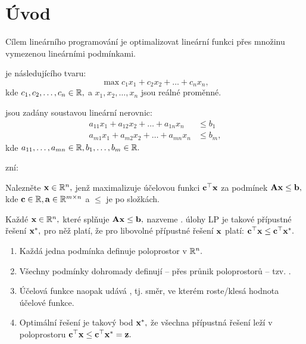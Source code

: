 \section{Úvod}

\begin{remark}
    Cílem lineárního programování je optimalizovat lineární funkci přes
    množinu vymezenou lineárními podmínkami.

     je následujícího tvaru:
    \begin{equation*}
        \max c_1x_1 + c_2x_2 + \dots + c_nx_n,
    \end{equation*}
    kde $c_1,c_2,\dots,c_n \in \mathbb{R},$ a $x_1,x_2,\dots,x_n$ jsou reálné
    proměnné.

     jsou zadány soustavou lineární nerovnic:
    \begin{align*}
        a_{11}x_1 + a_{12}x_2 + \dots + a_{1n}x_n &\leq b_1 \\
        a_{m1}x_1 + a_{m2}x_2 + \dots + a_{mn}x_n &\leq b_m,
    \end{align*}
    kde $a_{11},\dots,a_{mn} \in \mathbb{R}, b_1,\dots,b_m \in \mathbb{R}.$
\end{remark}

\begin{definition}
     zní:

    \begin{displayquote}
        Nalezněte $\mathbf{x} \in \mathbb{R}^n,$ jenž maximalizuje účelovou funkci 
        $\mathbf{c}^\top\mathbf{x}$ za podmínek $\mathbf{A}\mathbf{x} \leq \mathbf{b},$ kde $\mathbf{c} \in \mathbb{R},
        \mathbf{a} \in \mathbb{R}^{m\times n}$ a $\leq$ je po složkách.
    \end{displayquote}
    Každé $\mathbf{x} \in \mathbb{R}^n,$ které splňuje $\mathbf{A}\mathbf{x}\leq\mathbf{b},$ nazveme 
    .
     úlohy LP je takové přípustné řešení $\mathbf{x}^*,$
    pro něž platí, že pro libovolné přípustné řešení $\mathbf{x}$ platí:
    $\mathbf{c}^\top\mathbf{x} \leq \mathbf{c}^\top\mathbf{x}^*.$
        
\end{definition}

\begin{remark}
    \leavevmode
    \begin{enumerate}
        \item Každá jedna podmínka definuje poloprostor v $\mathbb{R}^n.$ 
        \item Všechny podmínky dohromady definují -- přes průnik 
            poloprostorů -- tzv. .
        \item Účelová funkce naopak udává , tj. směr, 
            ve kterém roste/klesá hodnota účelové funkce.
        \item Optimální řešení je takový bod $\mathbf{x}^*,$ že všechna přípustná
            řešení leží v poloprostoru $\mathbf{c}^\top\mathbf{x} \leq \mathbf{c}^\top\mathbf{x}^* = \mathbf{z}.$
    \end{enumerate}
\end{remark}

